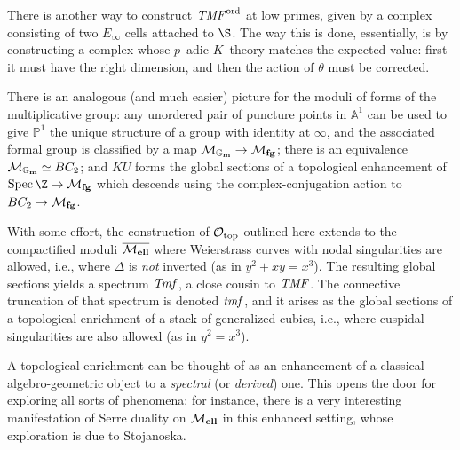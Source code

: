 \begin{remark}
There is another way to construct \(\mathit{TMF}^{\mathrm{ord}}\) at low primes, given by a complex consisting of two \(E_\infty\) cells attached to \(\S\).  The way this is done, essentially, is by constructing a complex whose \(p\)--adic \(K\)--theory matches the expected value: first it must have the right dimension, and then the action of \(\theta\) must be corrected.
\end{remark}

\begin{remark}
There is an analogous (and much easier) picture for the moduli of forms of the multiplicative group: any unordered pair of puncture points in \(\mathbb A^1\) can be used to give \(\mathbb P^1\) the unique structure of a group with identity at \(\infty\), and the associated formal group is classified by a map \(\mathcal{M}_{\mathbf{\mathbb G_m}} \to \mathcal{M}_{\mathbf{fg}}\); there is an equivalence \(\mathcal{M}_{\mathbf{\mathbb G_m}} \simeq BC_2\); and \(KU\) forms the global sections of a topological enhancement of \(\Spec \Z \to \moduli{fg}\) which descends using the complex-conjugation action to \(BC_2 \to \mathcal{M}_{\mathbf{fg}}\).
\end{remark}

\begin{remark}
With some effort, the construction of \(\mathcal{O}_{\mathrm{top}}\) outlined here extends to the compactified moduli \(\overline{\mathcal{M}_{\mathbf{ell}}}\) where Weierstrass curves with nodal singularities are allowed, i.e., where \(\Delta\) is \emph{not} inverted (as in \(y^2 + xy = x^3\)).  The resulting global sections yields a spectrum \(\mathit{Tmf}\), a close cousin to \(\mathit{TMF}\).  The connective truncation of that spectrum is denoted \(\mathit{tmf}\), and it arises as the global sections of a topological enrichment of a stack of generalized cubics, i.e., where cuspidal singularities are also allowed (as in \(y^2 = x^3\)).
\end{remark}

\begin{remark}
A topological enrichment can be thought of as an enhancement of a classical algebro-geometric object to a \textit{spectral} (or \textit{derived}) one.  This opens the door for exploring all sorts of phenomena: for instance, there is a very interesting manifestation of Serre duality on \(\mathcal{M}_{\mathbf{ell}}\) in this enhanced setting, whose exploration is due to Stojanoska.
\end{remark}




